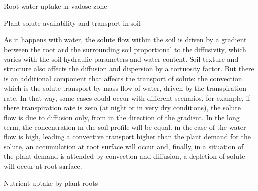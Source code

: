

\sec Root water uptake in vadose zone


\sec Plant solute availability and transport in soil


As it happens with water, the solute flow within the soil is driven by a gradient between the root and the surrounding soil proportional to the diffusivity, which varies with the soil hydraulic parameters and water content. Soil texture and structure also affects the diffusion and dispersion by a tortuosity factor. But there is an additional component that affects the transport of solute: the convection which is the solute transport by mass flow of water, driven by the transpiration rate. In that way, some cases could occur with different scenarios, for example, if there transpiration rate is zero (at night or in very dry conditions), the solute flow is due to diffusion only, from in the direction of the gradient. In the long term, the concentration in the soil profile will be equal. in the case of the water flow is high, leading a convective transport higher than the plant demand for the solute, an accumulation at root surface will occur and, finally, in a situation of the plant demand is attended by convection and diffusion, a depletion of solute will occur at root surface.

\sec Nutrient uptake by plant roots


